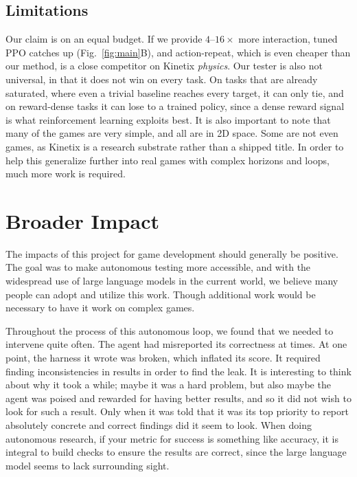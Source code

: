 \documentclass{article}
\begin{document}
\subsection{Limitations}
\label{sec:limits}
Our claim is on an equal budget. If we provide $4$--$16\times$ more interaction, tuned PPO catches up (Fig.~\ref{fig:main}B), and action-repeat, which is even cheaper than our method, is a close competitor on Kinetix \emph{physics}. Our tester is also not universal, in that it does not win on every task. On tasks that are already saturated, where even a trivial baseline reaches every target, it can only tie, and on reward-dense tasks it can lose to a trained policy, since a dense reward signal is what reinforcement learning exploits best. It is also important to note that many of the games are very simple, and all are in 2D space. Some are not even games, as Kinetix is a research substrate rather than a shipped title. In order to help this generalize further into real games with complex horizons and loops, much more work is required.

\section{Broader Impact}
The impacts of this project for game development should generally be positive. The goal was to make autonomous testing more
accessible, and with the widespread use of large language models in the current world, we believe many people can adopt and
utilize this work. Though additional work would be necessary to have it work on complex games.

Throughout the process of this autonomous loop, we found that we needed to intervene quite often. The agent had misreported
its correctness at times. At one point, the harness it wrote was broken, which inflated its score. It required finding inconsistencies in results in order to find the leak. It is interesting to think about why it took a while; maybe it was a
hard problem, but also maybe the agent was poised and rewarded for having better results, and so it did not wish to look for such
a result. Only when it was told that it was its top priority to report absolutely concrete and correct findings did it seem
to look. When doing autonomous research, if your metric for success is something like accuracy, it is integral to build
checks to ensure the results are correct, since the large language model seems to lack surrounding sight.
\end{document}
